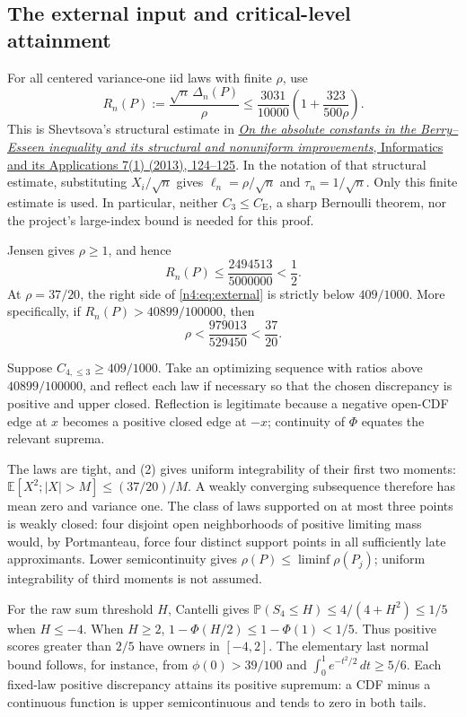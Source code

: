 \documentclass[11pt,a4paper]{article}
\numberwithin{equation}{section}
\theoremstyle{definition}
\theoremstyle{remark}
\newcommand{\E}{\mathbb E}
\newcommand{\Pp}{\mathbb P}
\newcommand{\CE}{C_{\mathrm E}}
\begin{document}
\subsection{The external input and critical-level attainment}
For all centered variance-one iid laws with finite $\rho$, use
\begin{equation}\label{n4:eq:external}
 R_n(P):=\frac{\sqrt n\,\Delta_n(P)}{\rho}
 \le\frac{3031}{10000}\left(1+\frac{323}{500\rho}\right).
\end{equation}
This is Shevtsova's structural estimate in
\href{https://www.mathnet.ru/eng/ia252}{\emph{On the absolute constants in
the Berry--Esseen inequality and its structural and nonuniform improvements},
Informatics and its Applications 7(1) (2013), 124--125}.
In the notation of that structural estimate, substituting
$X_i/\sqrt n$ gives $\ell_n=\rho/\sqrt n$ and $\tau_n=1/\sqrt n$.
Only this finite estimate is used. In particular, neither $C_3\le\CE$, a sharp Bernoulli theorem,
nor the project's large-index bound is needed for this proof.

Jensen gives $\rho\ge1$, and hence
\[
 R_n(P)\le\frac{2494513}{5000000}<\frac12.
\]
At $\rho=37/20$, the right side of \eqref{n4:eq:external} is strictly
below $409/1000$. More specifically, if
$R_n(P)>40899/100000$, then
\[
             \rho<\frac{979013}{529450}<\frac{37}{20}.
\tag{2}
\]

Suppose $C_{4,\le3}\ge409/1000$. Take an optimizing sequence with ratios
above $40899/100000$, and reflect each law if necessary so that the
chosen discrepancy is positive and upper closed. Reflection is legitimate
because a negative open-CDF edge at $x$ becomes a positive closed edge
at $-x$; continuity of $\Phi$ equates the relevant suprema.

The laws are tight, and (2) gives uniform integrability of their first
two moments: $\E[X^2;|X|>M]\le(37/20)/M$. A weakly converging subsequence
therefore has mean zero and variance one. The class of laws supported on
at most three points is weakly closed: four disjoint open neighborhoods
of positive limiting mass would, by Portmanteau, force four distinct
support points in all sufficiently late approximants. Lower
semicontinuity gives $\rho(P)\le\liminf\rho(P_j)$; uniform integrability
of third moments is not assumed.

For the raw sum threshold $H$, Cantelli gives
$\Pp(S_4\le H)\le4/(4+H^2)\le1/5$ when $H\le-4$.
When $H\ge2$, $1-\Phi(H/2)\le1-\Phi(1)<1/5$.
Thus positive scores greater than $2/5$ have owners in $[-4,2]$.
The elementary last normal bound follows, for instance, from
$\phi(0)>39/100$ and
$\int_0^1 e^{-t^2/2}\,dt\ge5/6$.
Each fixed-law positive discrepancy attains its positive supremum:
a CDF minus a continuous function is upper semicontinuous and tends
to zero in both tails.
\end{document}
